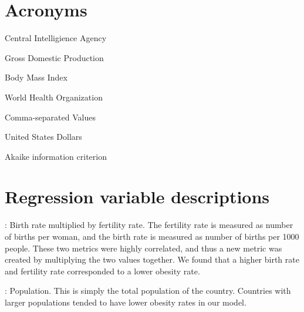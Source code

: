 \documentclass[oneside,12pt]{report}
\begin{document}
\chapter{Acronyms}\label{Acronyms}

 Central Intelligience Agency
\vspace{5pt}

 Gross Domestic Production

\vspace{5pt}

 Body Mass Index

\vspace{5pt}

 World Health Organization

\vspace{5pt}

 Comma-separated Values

\vspace{5pt}

 United States Dollars

\vspace{5pt}

 Akaike information criterion

\chapter{Regression variable descriptions}\label{chap:reg-vars}

: Birth rate multiplied by fertility rate. The fertility rate is measured as number of births per woman, and the birth rate is measured as number of births per 1000 people. These two metrics were highly correlated, and thus a new metric was created by multiplying the two values together. We found that a higher birth rate and fertility rate corresponded to a lower obesity rate.
\vspace{5pt}

: Population. This is simply the total population of the country. Countries with larger populations tended to have lower obesity rates in our model.
\vspace{5pt}
\end{document}
